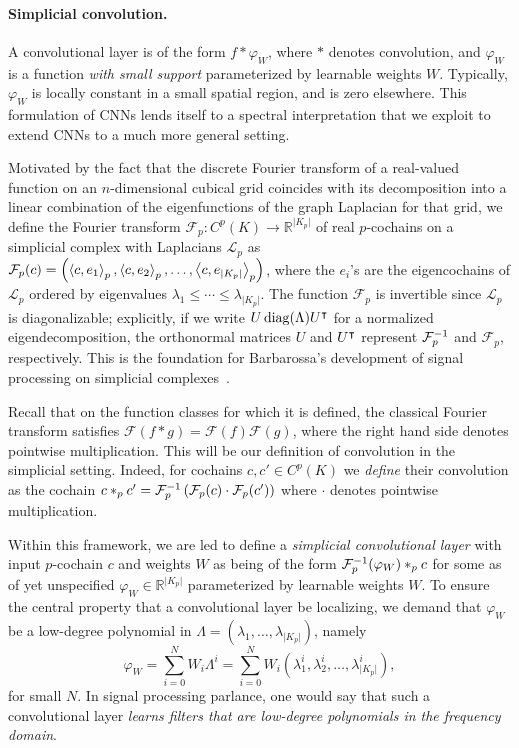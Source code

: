 \paragraph{Simplicial convolution.}
A convolutional layer is of the form $f\ast \varphi_W$, where $\ast$ denotes convolution, and $\varphi_W$ is a function
\emph{with small support} parameterized by learnable weights $W$.
Typically, $\varphi_W$ is locally constant in a small spatial region, and is zero elsewhere. This formulation of CNNs lends itself to a spectral interpretation that we exploit to extend CNNs to a much more general setting.

Motivated by the fact that the discrete Fourier transform of a real-valued function on an $n$-dimensional cubical grid coincides with its decomposition into a linear combination of the eigenfunctions of the graph Laplacian for that grid, we define the Fourier transform $\mathcal{F}_p: C^p(K) \to \mathbb{R}^{\lvert K_p \rvert}$ of real $p$-cochains on a simplicial complex with Laplacians $\mathcal{L}_p$ as $\mathcal{F}_p(c) = \left(\left\langle c , e_1 \right\rangle_p, \left\langle c , e_2 \right\rangle_p, \dotsc, \left\langle c , e_{\lvert K_p \rvert} \right\rangle_p\right)$, where the $e_i$'s are the eigencochains of $\mathcal{L}_p$ ordered by eigenvalues $\lambda_1\leq\dotsm\leq\lambda_{\lvert K_p \rvert}$. The function $\mathcal{F}_p$ is invertible since $\mathcal{L}_p$ is diagonalizable; explicitly, if we write $U\operatorname{diag}(\Lambda)U^{\intercal}$ for a normalized eigendecomposition, the orthonormal matrices $U$ and $U^{\intercal}$ represent $\mathcal{F}^{-1}_p$ and $\mathcal{F}_p$, respectively. This is the foundation for Barbarossa's development of signal processing on simplicial complexes~\cite{barbarossa2018learning}.

Recall that on the function classes for which it is defined, the classical Fourier transform satisfies $\mathcal{F}(f\ast g)=\mathcal{F}(f)\mathcal{F}(g)$, where the right hand side denotes pointwise multiplication. This will be our definition of convolution in the simplicial setting. Indeed, for cochains $c,c'\in C^p(K)$ we \emph{define} their convolution as the cochain $c\ast_p c' = \mathcal{F}_p^{-1}\left(\mathcal{F}_p(c)\cdot\mathcal{F}_p(c')\right)$ where $\cdot$ denotes pointwise multiplication.

Within this framework, we are led to define a \emph{simplicial convolutional layer} with input $p$-cochain $c$ and weights $W$ as being of the form $\mathcal{F}^{-1}_p(\varphi_W)\ast_p c$ for some as of yet unspecified $\varphi_W\in\mathbb{R}^{\lvert K_p \rvert}$ parameterized by learnable weights $W$. To ensure the central property that a convolutional layer be localizing, we demand that $\varphi_W$ be a low-degree polynomial in $\Lambda=(\lambda_1, \dotsc, \lambda_{\lvert K_p \rvert})$, namely
\begin{equation*}
  \varphi_W = \sum_{i=0}^N W_i\Lambda^i = \sum_{i=0}^N W_i(\lambda^i_1, \lambda^i_2, \dotsc, \lambda^i_{\lvert K_p \rvert}),
\end{equation*}
for small $N$. In signal processing parlance, one would say that such a convolutional layer \emph{learns filters that are low-degree polynomials in the frequency domain}.

